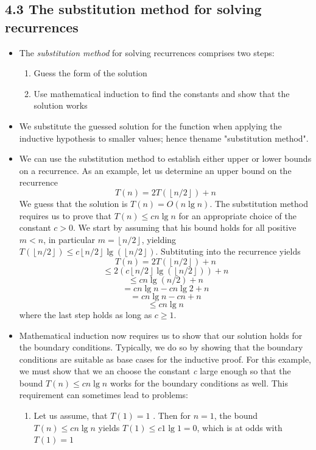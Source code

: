 \documentclass{report}
\begin{document}
\subsection*{4.3 The substitution method for solving recurrences}
\begin{itemize}
    \item The \textit{substitution method} for solving recurrences comprises two steps:
    \begin{enumerate}
        \item Guess the form of the solution
        \item Use mathematical induction to find the constants and show that the solution works
    \end{enumerate}
    \item We substitute the guessed solution for the function when applying the inductive hypothesis to smaller values; hence thename "substitution method".
    \item We can use the substitution method to establish either upper or lower bounds on a recurrence. As an example, let us determine an upper bound on the recurrence
    $$T(n) = 2T(\left \lfloor{n/2} \right \rfloor) + n$$
    We guess that the solution is $T(n) = O(n \lg n)$. The substitution method requires us to prove that $T(n) \leq cn \lg n$ for an appropriate choice of the constant $c > 0$. We start by assuming that his bound holds for all positive $m < n$, in particular $m = \left \lfloor{n/2} \right \rfloor$, yielding $T(\left \lfloor{n/2} \right \rfloor) \leq c \left \lfloor{n/2} \right \rfloor \lg(\left \lfloor{n/2} \right \rfloor)$. Subtituting into the recurrence yields
    $$T(n) = 2T(\left \lfloor{n/2} \right \rfloor) + n$$
    $$\leq 2(c \left \lfloor{n/2} \right \rfloor \lg(\left \lfloor{n/2} \right \rfloor)) + n$$
    $$\leq cn \lg(n/2) + n$$
    $$= cn \lg n - cn \lg 2 + n$$
    $$= cn \lg n - cn + n$$
    $$\leq cn \lg n$$
    where the last step holds as long as $c \geq 1$.
    \item Mathematical induction now requires us to show that our solution holds for the boundary conditions. Typically, we do so by showing that the boundary conditions are suitable as base cases for the inductive proof. For this example, we must show that we an choose the constant \textit{c} large enough so that the bound $T(n) \leq cn \lg n$ works for the boundary conditions as well. This requirement can sometimes lead to problems:
    \begin{enumerate}
        \item Let us assume, that $T(1) = 1$ . Then for $n = 1$, the bound $T(n) \leq cn \lg n$ yields $T(1) \leq c1 \lg 1 = 0$, which is at odds with $T(1) = 1$

\end{enumerate}
\end{itemize}
\end{document}
